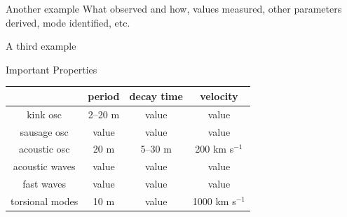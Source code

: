 \documentclass[table]{beamer}
\begin{document}
\begin{frame}{Another example}
    What observed and how, values measured, other parameters derived,
    mode identified, etc.
\end{frame}%
\begin{frame}{A third example}
\end{frame}%
\begin{frame}{Important Properties}
\begin{center}
    \begin{tabular}{c|c|c|c|}
    \cline{2-4} & {\textbf{period}} &
        {\textbf{decay time}} &
        {\textbf{velocity}}\\
    \hline \multicolumn{0}{|c|}{kink osc} & 2--20 m & value & value\\
    \hline \multicolumn{0}{|c|}{sausage osc} & value & value & value\\
    \hline \multicolumn{0}{|c|}{acoustic osc} & 20 m & 5--30 m & 200 km s$^{-1}$\\
    \hline \multicolumn{0}{|c|}{acoustic waves} & value & value & value\\
    \hline \multicolumn{0}{|c|}{fast waves} & value & value & value\\
    \hline \multicolumn{0}{|c|}{torsional modes} & 10 m & value &
        1000 km s$^{-1}$\\
    \hline
    \end{tabular}
\end{center}
\end{frame}%
\end{document}
